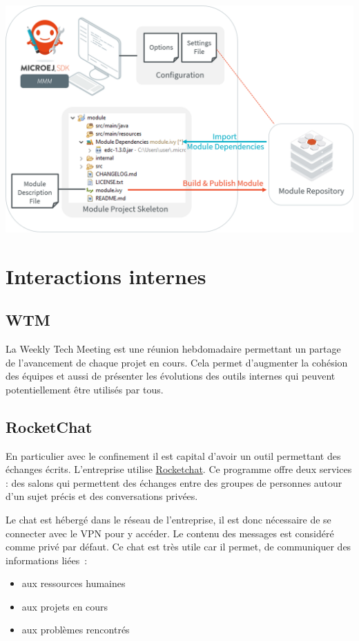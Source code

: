 \documentclass[french,a4paper,12pt]{report}
\begin{document}
\begin{center}
\includegraphics[width=.8\textwidth]{./ressources/schemas/mmm_flow.png}
\end{center}

\section{Interactions internes}

\subsection{WTM}

La Weekly Tech Meeting est une réunion hebdomadaire permettant un partage de l’avancement de chaque projet en cours. Cela permet d'augmenter la cohésion des équipes et aussi de présenter les évolutions des outils internes qui peuvent potentiellement être utilisés par tous.

\subsection{RocketChat}

En particulier avec le confinement il est capital d’avoir un outil permettant des échanges écrits. L'entreprise utilise \href{https://rocket.chat/}{Rocketchat}. Ce programme offre deux services : des salons qui permettent des échanges entre des groupes de personnes autour d'un sujet précis et des conversations privées.

Le chat est hébergé dans le réseau de l’entreprise, il est donc nécessaire de se connecter avec le VPN pour y accéder. Le contenu des messages est considéré comme privé par défaut.
Ce chat est très utile car il permet, de communiquer des informations liées :

\begin{itemize}
\setcounter{enumi}{-1}
\item aux ressources humaines
\item aux projets en cours
\item aux problèmes rencontrés
\end{itemize}
\end{document}
